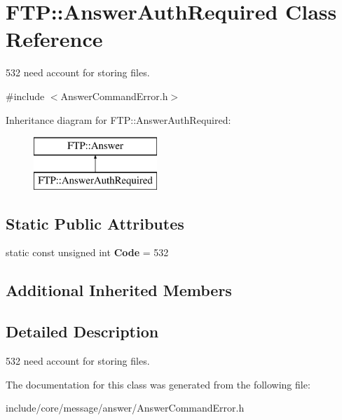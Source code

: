 \hypertarget{class_f_t_p_1_1_answer_auth_required}{\section{F\-T\-P\-:\-:Answer\-Auth\-Required Class Reference}
\label{class_f_t_p_1_1_answer_auth_required}
}


532 need account for storing files.  




{\ttfamily \#include $<$Answer\-Command\-Error.\-h$>$}

Inheritance diagram for F\-T\-P\-:\-:Answer\-Auth\-Required\-:\begin{figure}[H]
\begin{center}
\leavevmode
\includegraphics[height=2.000000cm]{class_f_t_p_1_1_answer_auth_required}
\end{center}
\end{figure}
\subsection*{Static Public Attributes}
\begin{DoxyCompactItemize}
\item 
\hypertarget{class_f_t_p_1_1_answer_auth_required_a0b31d375012cdc068704bcf4d1a88bf3}{static const unsigned int {\bfseries Code} = 532}\label{class_f_t_p_1_1_answer_auth_required_a0b31d375012cdc068704bcf4d1a88bf3}

\end{DoxyCompactItemize}
\subsection*{Additional Inherited Members}


\subsection{Detailed Description}
532 need account for storing files. 

The documentation for this class was generated from the following file\-:\begin{DoxyCompactItemize}
\item 
include/core/message/answer/Answer\-Command\-Error.\-h\end{DoxyCompactItemize}
